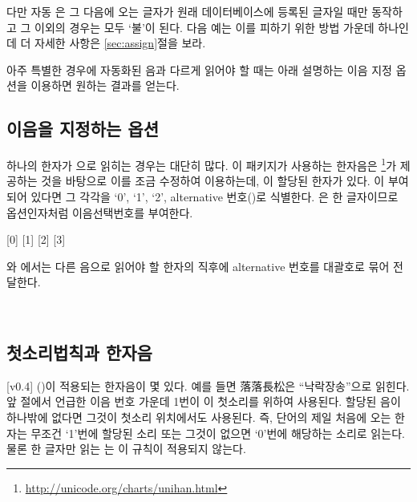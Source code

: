 \documentclass[a4paper,12pt,itemph,footnote]{oblivoir}
\begin{document}
다만 자동 은 그 다음에 오는 글자가 원래 데이터베이스에 등록된
글자일 때만 동작하고 그 이외의 경우는 모두 `불'이 된다. 다음 예는 이를 피하기
위한 방법 가운데 하나인데 더 자세한 사항은
\ref{sec:assign}절을 보라.
\begin{myexam}[]
 
\end{myexam}

아주 특별한 경우에 자동화된 음과 다르게 읽어야 할 때는 아래 설명하는 이음 지정 옵션을
이용하면 원하는 결과를 얻는다.

\subsection{이음을 지정하는 옵션}

하나의 한자가 으로 읽히는 경우는 대단히 많다. 이 패키지가 사용하는 한자음은
\footnote{\url{http://unicode.org/charts/unihan.html}}가
제공하는 것을 바탕으로 이를 조금 수정하여 이용하는데, 이 할당된 한자가 있다.
이 부여되어 있다면 그 각각을 `0', `1', `2',  alternative 번호()로
식별한다. 
은 한 글자이므로 옵션인자처럼 이음선택번호를 부여한다.
\begin{myexam}[]
[0] [1] [2] [3]
\end{myexam}
와 에서는 다른 음으로 읽어야 할
한자의 직후에 alternative 번호를 대괄호로 묶어 전달한다.
\begin{myexam}[]
  \\
   
\end{myexam}

\subsection{첫소리법칙과 한자음}

[v0.4]
()이 적용되는 한자음이 몇 있다. 예를 들면 落落長松은 ``낙락장송''으로 읽힌다.
앞 절에서 언급한 이음 번호 가운데 1번이 이 첫소리를 위하여 사용된다. 할당된 음이 하나밖에 없다면
그것이 첫소리 위치에서도 사용된다.
즉, 단어의 제일 처음에 오는 한자는 무조건 `1'번에 할당된 소리 또는 그것이 없으면 `0'번에 해당하는 소리로 읽는다. 물론 한 글자만 읽는 는 
이 규칙이 적용되지 않는다.
\begin{myexam}[]
   
\end{myexam}
\end{document}

